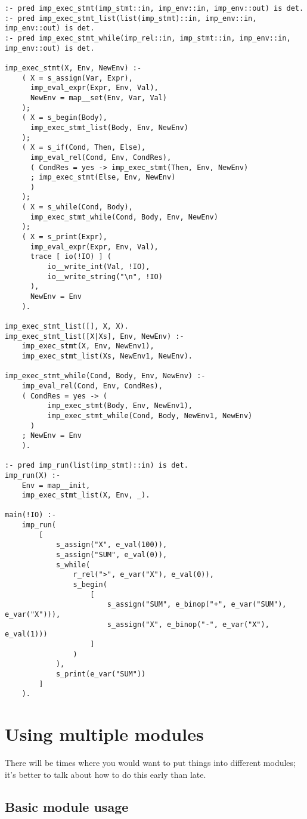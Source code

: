 \begin{lstlisting}[language=Mercury]
:- pred imp_exec_stmt(imp_stmt::in, imp_env::in, imp_env::out) is det.
:- pred imp_exec_stmt_list(list(imp_stmt)::in, imp_env::in, imp_env::out) is det.
:- pred imp_exec_stmt_while(imp_rel::in, imp_stmt::in, imp_env::in, imp_env::out) is det.

imp_exec_stmt(X, Env, NewEnv) :-
	( X = s_assign(Var, Expr),
	  imp_eval_expr(Expr, Env, Val),
	  NewEnv = map__set(Env, Var, Val)
	);
	( X = s_begin(Body),
	  imp_exec_stmt_list(Body, Env, NewEnv)
	);
	( X = s_if(Cond, Then, Else),
	  imp_eval_rel(Cond, Env, CondRes),
	  ( CondRes = yes -> imp_exec_stmt(Then, Env, NewEnv)
	  ; imp_exec_stmt(Else, Env, NewEnv)
	  )
	);
	( X = s_while(Cond, Body),
	  imp_exec_stmt_while(Cond, Body, Env, NewEnv)
	);
	( X = s_print(Expr),
	  imp_eval_expr(Expr, Env, Val),
	  trace [ io(!IO) ] (
		  io__write_int(Val, !IO),
		  io__write_string("\n", !IO)
	  ),
	  NewEnv = Env
	).

imp_exec_stmt_list([], X, X).
imp_exec_stmt_list([X|Xs], Env, NewEnv) :-
	imp_exec_stmt(X, Env, NewEnv1),
	imp_exec_stmt_list(Xs, NewEnv1, NewEnv).

imp_exec_stmt_while(Cond, Body, Env, NewEnv) :-
	imp_eval_rel(Cond, Env, CondRes),
	( CondRes = yes -> (
		  imp_exec_stmt(Body, Env, NewEnv1),
		  imp_exec_stmt_while(Cond, Body, NewEnv1, NewEnv)
	  )
	; NewEnv = Env
	).

:- pred imp_run(list(imp_stmt)::in) is det.
imp_run(X) :-
	Env = map__init,
	imp_exec_stmt_list(X, Env, _).
	
main(!IO) :-
	imp_run(
		[
			s_assign("X", e_val(100)),
			s_assign("SUM", e_val(0)),
			s_while(
				r_rel(">", e_var("X"), e_val(0)),
				s_begin(
					[
						s_assign("SUM", e_binop("+", e_var("SUM"), e_var("X"))),
						s_assign("X", e_binop("-", e_var("X"), e_val(1)))
					]
				)
			),
			s_print(e_var("SUM"))
		]
	).
\end{lstlisting}

\section{Using multiple modules}

There will be times where you would want to put things into different modules; it's better to talk about how to do this early than late.

\subsection{Basic module usage}

